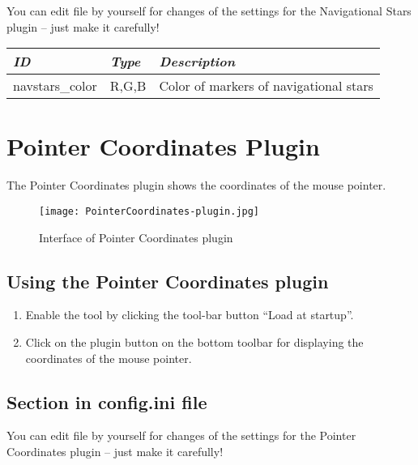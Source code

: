 You can edit  file by yourself for changes of the
settings for the Navigational Stars plugin -- just make it carefully!

\begin{longtabu} to \textwidth {l|l|X}\toprule
\emph{ID}            & \emph{Type} & \emph{Description}\\\midrule
navstars\_color          & R,G,B & Color of markers of navigational stars  \\\bottomrule
\end{longtabu}

\newpage

\section{Pointer Coordinates Plugin}
\label{sec:plugins:PointerCoordinates}

The Pointer Coordinates plugin shows the coordinates of the mouse pointer.

\begin{figure}[h]
\texttt{[image: PointerCoordinates-plugin.jpg]}
\label{fig:PointerCoordinates}
\caption{Interface of Pointer Coordinates plugin}
\end{figure}

\subsection{Using the Pointer Coordinates plugin}
\label{sec:plugins:PointerCoordinates:using}

\begin{enumerate}
\item Enable the tool by clicking the tool-bar button ``Load at startup''.
\item Click on the plugin button on the bottom toolbar for displaying the coordinates of the mouse pointer.
\end{enumerate}

\subsection{Section  in config.ini file}
\label{sec:plugins:PointerCoordinates:config}

You can edit  file by yourself for changes of the
settings for the Pointer Coordinates plugin -- just make it carefully!

